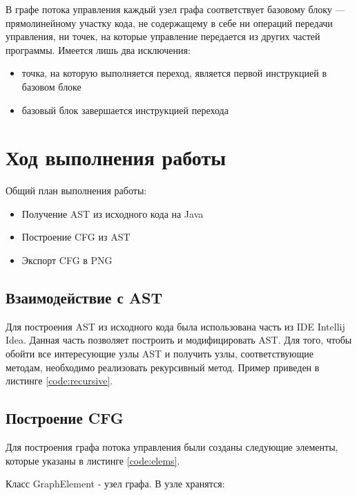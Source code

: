 В графе потока управления каждый узел графа соответствует базовому блоку --- прямолинейному участку кода, не содержащему в себе ни операций передачи управления, ни точек, на которые управление передается из других частей программы. Имеется лишь два исключения:
\begin{itemize}
\item точка, на которую выполняется переход, является первой инструкцией в базовом блоке
\item базовый блок завершается инструкцией перехода
\end{itemize}

\section{Ход выполнения работы}

Общий план выполнения работы:
\begin{itemize}
\item Получение AST из исходного кода на Java
\item Построение CFG из AST
\item Экспорт CFG в PNG
\end{itemize}

\subsection{Взаимодействие с AST}

Для построения AST из исходного кода была использована часть из IDE Intellij Idea. Данная часть позволяет построить и модифицировать AST. Для того, чтобы обойти все интересующие узлы AST и получить узлы, соответствующие методам, необходимо реализовать рекурсивный метод. Пример приведен в листинге \ref{code:recursive}. 


\parindent=1cm

\subsection{Построение CFG}

Для построения графа потока управления были созданы следующие элементы, которые указаны в листинге \ref{code:elems}.


\parindent=1cm

Класс GraphElement - узел графа. В узле хранятся:

